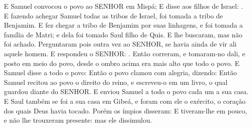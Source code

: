 {  E Samuel convocou o povo ao SENHOR em Mispá;
  E disse aos filhos de Israel: .
  E fazendo achegar Samuel todas as tribos de Israel, foi tomada a tribo de Benjamim.
  E fez chegar a tribo de Benjamim por suas linhagens, e foi tomada a família de Matri; e dela foi tomado Saul filho de Quis. E lhe buscaram, mas não foi achado.
  Perguntaram pois outra vez ao SENHOR, se havia ainda de vir ali aquele homem. E respondeu o SENHOR: .
  Então correram, e tomaram-no dali, e posto em meio do povo, desde o ombro acima era mais alto que todo o povo.
  E Samuel disse a todo o povo:  Então o povo clamou com alegria, dizendo: 
  Então Samuel recitou ao povo o direito do reino, e escreveu-o em um livro, o qual guardou diante do SENHOR.
  E enviou Samuel a todo o povo cada um a sua casa. E Saul também se foi a sua casa em Gibeá, e foram com ele o exército, o coração dos quais Deus havia tocado.
  Porém os ímpios disseram:  E tiveram-lhe em pouco, e não lhe trouxeram presente: mas ele dissimulou.
\par }

